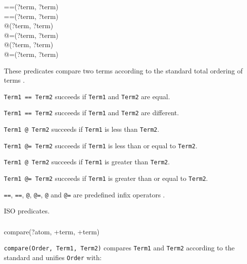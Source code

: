 \begin{TemplatesTwoCols}
==(?term, ?term)\\
{\bs}==(?term, ?term) \\
@{\lt}(?term, ?term) \\
@={\lt}(?term, ?term)\\
@{\gt}(?term, ?term)\\
@{\gt}=(?term, ?term)

\end{TemplatesTwoCols}

\Description

These predicates compare two terms according to the standard total ordering
of terms .

\texttt{Term1 == Term2} succeeds if \texttt{Term1} and \texttt{Term2} are
equal.

\texttt{Term1 {\bs}== Term2} succeeds if \texttt{Term1} and
\texttt{Term2} are different.

\texttt{Term1 @{\lt} Term2} succeeds if \texttt{Term1} is less than
\texttt{Term2}.

\texttt{Term1 @={\lt} Term2} succeeds if \texttt{Term1} is less than or
equal to \texttt{Term2}.

\texttt{Term1 @{\gt} Term2} succeeds if \texttt{Term1} is greater than
\texttt{Term2}.

\texttt{Term1 @{\gt}= Term2} succeeds if \texttt{Term1} is greater than
or equal to \texttt{Term2}.

\texttt{==}, \texttt{{\bs}==}, \texttt{@{\lt}}, \texttt{@={\lt}},
\texttt{@{\gt}} and \texttt{@{\gt}=} are predefined infix operators .

\PlErrorsNone

\Portability

ISO predicates.

\subsubsection{ \label{compare/3}}

\begin{TemplatesOneCol}
compare(?atom, +term, +term)

\end{TemplatesOneCol}

\Description

\texttt{compare(Order, Term1, Term2)} compares \texttt{Term1} and
\texttt{Term2} according to the standard  and unifies \texttt{Order} with:

